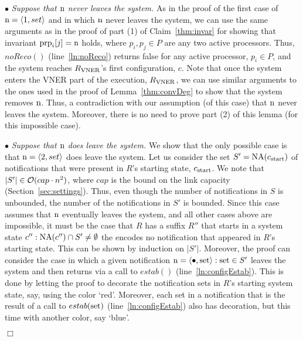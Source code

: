 \documentclass[11pt]{article}
\newcommand{\notif}{prp}
\newenvironment{proof}{\noindent{\bf Proof.}}{\hfill$\Box$}
\begin{document}
\begin{proof}
\noindent$\bullet$ \textit{Suppose that $\textnormal{n}$ never leaves the system.}
As in the proof of the first case of $\textnormal{n} = \langle 1, set \rangle$  and in which $\textnormal{n}$ never leaves the system, we can use the same arguments as in the proof of part (1) of Claim~\ref{thm:invar} for showing that invariant   
$\textnormal{\notif}_i[j] = \textnormal{n}$ holds, where $p_i, p_j \in P$ are any two active processors. Thus, $noReco()$ (line~\ref{ln:noReco}) returns false for any active processor, $p_i \in P$, and the system reaches $R_{\textnormal{VNER}}$'s first configuration, $c$. 
Note that once the system enters the VNER part of the execution, $R_{\textnormal{VNER}}$, we can use similar arguments to the ones used in the proof of Lemma~\ref{thm:convDeg} to show that the system removes $\textnormal{n}$. Thus, a contradiction with our assumption (of this case) that $\textnormal{n}$ never leaves the system. Moreover, there is no need to prove part (2) of this lemma (for this impossible case). 

\noindent$\bullet$ \textit{Suppose that $\textnormal{n}$ does leave the system.}
We show that the only possible case is that $\textnormal{n} = \langle 2, set \rangle$ does leave the system. Let us  consider the set $S'=\textnormal{NA}(c_{\textnormal{start}})$ of notifications that were present in $R$'s starting state, $c_{\textnormal{start}}$. We note that $|S'| \in {\cal O}(cap \cdot n^2)$, where $cap$ is the bound on the link capacity (Section~\ref{sec:settings}). Thus, even though the number of notifications in $S$ is unbounded, the number of the notifications in $S'$ is bounded. Since this case assumes that $\textnormal{n}$ eventually leaves the system, and all other cases above are impossible, it must be the case that $R$ has a suffix $R''$ that starts in a system state $c'' :\textnormal{NA}(c'') \cap S' \neq \emptyset$ the encodes no notification that appeared in $R$'s starting state. This can be shown by induction on $|S'|$. Moreover, the proof can consider the case in which a given notification $\textnormal{n}=\langle \bullet, \textnormal{set} \rangle: \textnormal{set} \in S'$ leaves the system and then returns via a call to $estab()$ (line~\ref{ln:configEstab}). This is done by letting the proof to decorate the notification sets in $R$'s starting system state, say, using the color `red'. Moreover, each set in a notification that is the result of a call to $estab(\textnormal{set})$ (line~\ref{ln:configEstab}) also has  decoration, but this time with another color, say `blue'. 



\end{proof}
\end{document}

